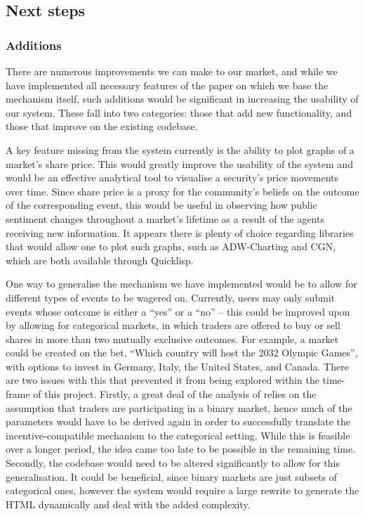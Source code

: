\subsection{Next steps}

\subsubsection{Additions}

There are numerous improvements we can make to our market, and while we have
implemented all necessary features of the paper on which we base the mechanism
itself, such additions would be significant in increasing the usability of our
system. These fall into two categories: those that add new functionality, and
those that improve on the existing codebase.

A key feature missing from the system currently is the ability to plot graphs
of a market's share price. This would greatly improve the usability of the
system and would be an effective analytical tool to visualise a security's
price movements over time. Since share price is a proxy for the community's
beliefs on the outcome of the corresponding event, this would be useful in
observing how public sentiment changes throughout a market's lifetime as a
result of the agents receiving new information. It appears there is plenty of
choice regarding libraries that would allow one to plot such graphs, such as
ADW-Charting and CGN, which are both available through Quicklisp.

One way to generalise the mechanism we have implemented would be to allow for
different types of events to be wagered on. Currently, users may only submit
events whose outcome is either a ``yes'' or a ``no'' -- this could be improved
upon by allowing for categorical markets, in which traders are offered to buy
or sell shares in more than two mutually exclusive outcomes. For example, a
market could be created on the bet, ``Which country will host the 2032 Olympic
Games'', with options to invest in Germany, Italy, the United States, and
Canada. There are two issues with this that prevented it from being explored
within the time-frame of this project. Firstly, a great deal of the analysis of
\cite{Freeman2017} relies on the assumption that traders are participating in a
binary market, hence much of the parameters would have to be derived again in
order to successfully translate the incentive-compatible mechanism to the
categorical setting. While this is feasible over a longer period, the idea came
too late to be possible in the remaining time. Secondly, the codebase would
need to be altered significantly to allow for this generalisation. It could be
beneficial, since binary markets are just subsets of categorical ones, however
the system would require a large rewrite to generate the HTML dynamically and
deal with the added complexity.

